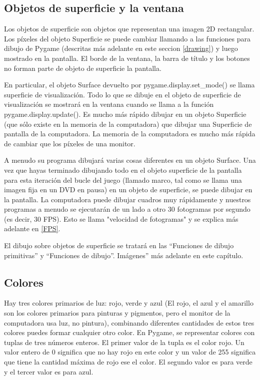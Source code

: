 





\subsection{Objetos de superficie y la ventana}

Los objetos de superficie son objetos que representan una imagen 2D rectangular. Los píxeles del objeto Superficie
se puede cambiar llamando a las funciones para dibujo de Pygame (descritas más adelante en este seccion \ref{drawing}) y luego
mostrado en la pantalla. El borde de la ventana, la barra de título y los botones no forman parte de objeto de superficie la pantalla.

En particular, el objeto Surface devuelto por {\ttfamily pygame.display.set\_mode()} se llama
superficie de visualización. Todo lo que se dibuje en el objeto de superficie de visualización se mostrará en la
ventana cuando se llama a la función {\ttfamily pygame.display.update()}. Es mucho más rápido dibujar en un objeto Superficie (que sólo existe en la memoria de la computadora) que dibujar una Superficie de pantalla de la computadora. La memoria de la computadora es mucho más rápida de cambiar que los píxeles de una monitor.

A menudo su programa dibujará varias cosas diferentes en un objeto Surface. Una vez que hayas terminado
dibujando todo en el objeto  superficie de la pantalla para esta iteración del bucle del juego (llamado
marco, tal como se llama una imagen fija en un DVD en pausa) en un objeto de superficie, se puede dibujar en
la pantalla. La computadora puede dibujar cuadros muy rápidamente y nuestros programas a menudo se ejecutarán de un lado a otro
30 fotogramas por segundo (es decir, 30 FPS). Esto se llama "{}velocidad de fotogramas"{} y se explica más adelante en \ref{FPS}.

El dibujo sobre objetos de superficie se tratará en las “Funciones de dibujo primitivas” y “Funciones de dibujo”.
Imágenes” más adelante en este capítulo.


\subsection{Colores}

Hay tres colores primarios de luz: rojo, verde y azul (El rojo, el azul y el amarillo son los
colores primarios para pinturas y pigmentos, pero el monitor de la computadora usa luz, no pintura), 
combinando diferentes cantidades de estos tres colores puedes formar cualquier otro color. En Pygame, 
se representar colores con tuplas de tres números enteros. El primer valor de la tupla es el color rojo. Un valor entero de 0 significa que no hay rojo en este color y un valor de 255 significa que tiene la cantidad máxima de rojo ese el color. El segundo valor es para verde y el tercer valor es para azul.


